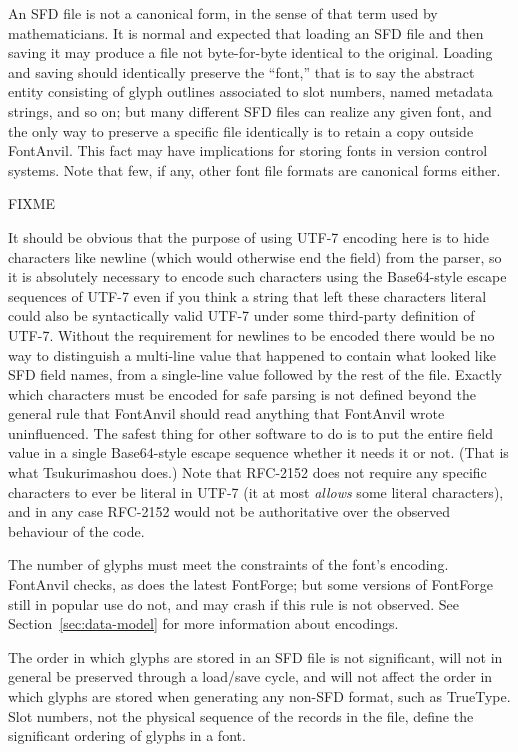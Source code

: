 \documentclass[11pt]{report}
\begin{document}
An SFD file is not a canonical form, in the sense of that term used by
mathematicians.  It is normal and expected that loading an SFD file and then
saving it may produce a file not byte-for-byte identical to the original. 
Loading and saving should identically preserve the  ``font,'' that is to
say the abstract entity consisting of glyph outlines associated to slot
numbers, named metadata strings, and so on; but many different SFD files can
realize any given font, and the only way to preserve a specific file
identically is to retain a copy outside FontAnvil.  This fact may have
implications for storing fonts in version control systems.  Note that few,
if any, other font file formats are canonical forms either.

FIXME

It should be obvious that the purpose of using UTF-7 encoding here is to
hide characters like newline (which would otherwise end the field) from the
parser, so it is absolutely necessary to encode such characters using the
Base64-style escape sequences of UTF-7 even if you think a string that left
these characters literal could also be syntactically valid UTF-7 under some
third-party definition of UTF-7.  Without the requirement for newlines to be
encoded there would be no way to distinguish a multi-line value that
happened to contain what looked like SFD field names, from a single-line
value followed by the rest of the file.  Exactly which characters must be
encoded for safe parsing is not defined beyond the general rule that
FontAnvil should read anything that FontAnvil wrote uninfluenced.  The
safest thing for other software to do is to put the entire field value in a
single Base64-style escape sequence whether it needs it or not.  (That is
what Tsukurimashou does.) Note that RFC-2152 does not require any specific
characters to ever be literal in UTF-7 (it at most \emph{allows} some
literal characters), and in any case RFC-2152 would not be authoritative
over the observed behaviour of the code.

The number of glyphs must meet the constraints of the font's encoding. 
FontAnvil checks, as does the latest FontForge; but some versions of
FontForge still in popular use do not, and may crash if this rule is not
observed.  See Section~\ref{sec:data-model} for more information about
encodings.

The order in which glyphs are stored in an SFD file is not significant, will
not in general be preserved through a load/save cycle, and will not affect
the order in which glyphs are stored when generating any non-SFD format,
such as TrueType.  Slot numbers, not the physical sequence of the records in
the file, define the significant ordering of glyphs in a font.
\end{document}
